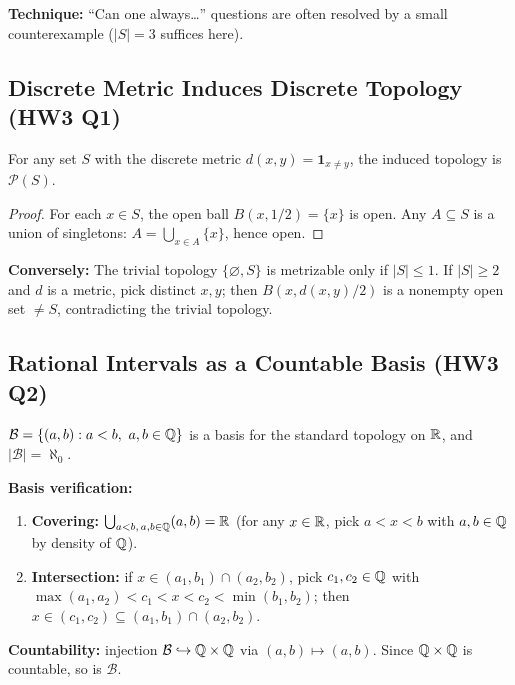 \documentclass{article}
\begin{document}
\textbf{Technique:} ``Can one always\ldots'' questions are often
resolved by a small counterexample ($|S| = 3$ suffices here).

\subsection{Discrete Metric Induces Discrete Topology (HW3 Q1)}
\begin{proposition}
  For any set $S$ with the discrete metric $d(x,y) = \mathbf{1}_{x \ne
  y}$, the induced topology is $\mathcal{P}(S)$.
\end{proposition}
\begin{proof}
  For each $x \in S$, the open ball $B(x, 1/2) = \{x\}$ is open.
  Any $A \subseteq S$ is a union of singletons: $A = \bigcup_{x \in A}
  \{x\}$, hence open.
\end{proof}

\textbf{Conversely:} The trivial topology $\{\varnothing, S\}$ is
metrizable only if $|S| \le 1$. If $|S| \ge 2$ and $d$ is a metric,
pick distinct $x, y$; then $B(x, d(x,y)/2)$ is a nonempty open set
$\ne S$, contradicting the trivial topology.

\subsection{Rational Intervals as a Countable Basis (HW3 Q2)}
\begin{proposition}
  $\mathcal{B} = \{(a,b) : a < b,\ a,b \in \mathbb{Q}\}$ is a basis for the
  standard topology on $\mathbb{R}$, and $|\mathcal{B}| = \aleph_0$.
\end{proposition}
\textbf{Basis verification:}
\begin{enumerate}
  \item \textbf{Covering:} $\bigcup_{a<b,\, a,b \in \mathbb{Q}} (a,b) = \mathbb{R}$
    (for any $x \in \mathbb{R}$, pick $a < x < b$ with $a, b \in \mathbb{Q}$ by
    density of $\mathbb{Q}$).
  \item \textbf{Intersection:} if $x \in (a_1,b_1) \cap (a_2,b_2)$,
    pick $c_1, c_2 \in \mathbb{Q}$ with $\max(a_1,a_2) < c_1 < x < c_2 <
    \min(b_1,b_2)$; then $x \in (c_1,c_2) \subseteq (a_1,b_1) \cap
    (a_2,b_2)$.
\end{enumerate}
\textbf{Countability:} injection $\mathcal{B} \hookrightarrow \mathbb{Q} \times
\mathbb{Q}$ via $(a,b) \mapsto (a,b)$. Since $\mathbb{Q} \times \mathbb{Q}$ is countable, so is
$\mathcal{B}$.
\end{document}
